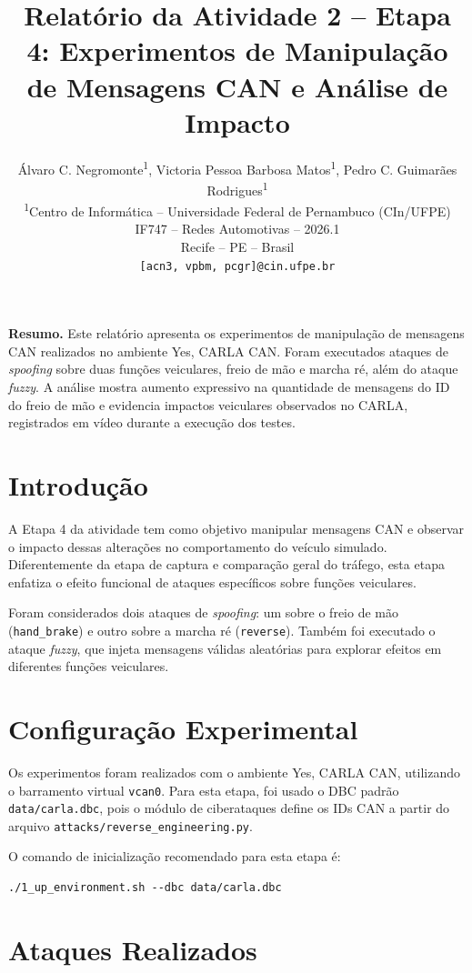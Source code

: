 \documentclass[12pt,a4paper]{article}
\title{\textbf{Relat\'orio da Atividade 2 -- Etapa 4: Experimentos de Manipula\c{c}\~ao de Mensagens CAN e An\'alise de Impacto}}
\author{
\'Alvaro C. Negromonte\textsuperscript{1},
Victoria Pessoa Barbosa Matos\textsuperscript{1},
Pedro C. Guimar\~aes Rodrigues\textsuperscript{1}
\\[0.3cm]
\textsuperscript{1}Centro de Inform\'atica -- Universidade Federal de Pernambuco (CIn/UFPE)
\\
IF747 -- Redes Automotivas -- 2026.1
\\
Recife -- PE -- Brasil
\\
\texttt{[acn3, vpbm, pcgr]@cin.ufpe.br}
}
\date{}
\begin{document}
\maketitle

\noindent\textbf{Resumo.}
Este relat\'orio apresenta os experimentos de manipula\c{c}\~ao de mensagens CAN
realizados no ambiente Yes, CARLA CAN. Foram executados ataques de \textit{spoofing}
sobre duas fun\c{c}\~oes veiculares, freio de m\~ao e marcha r\'e, al\'em do ataque
\textit{fuzzy}. A an\'alise mostra aumento expressivo na quantidade de mensagens do ID
do freio de m\~ao e evidencia impactos veiculares observados no CARLA, registrados em
v\'ideo durante a execu\c{c}\~ao dos testes.

\section{Introdu\c{c}\~ao}

A Etapa 4 da atividade tem como objetivo manipular mensagens CAN e observar o
impacto dessas altera\c{c}\~oes no comportamento do ve\'iculo simulado. Diferentemente da
etapa de captura e compara\c{c}\~ao geral do tr\'afego, esta etapa enfatiza o efeito funcional
de ataques espec\'ificos sobre fun\c{c}\~oes veiculares.

Foram considerados dois ataques de \textit{spoofing}: um sobre o freio de m\~ao
(\texttt{hand\_brake}) e outro sobre a marcha r\'e (\texttt{reverse}). Tamb\'em foi
executado o ataque \textit{fuzzy}, que injeta mensagens v\'alidas aleat\'orias para
explorar efeitos em diferentes fun\c{c}\~oes veiculares.

\section{Configura\c{c}\~ao Experimental}

Os experimentos foram realizados com o ambiente Yes, CARLA CAN, utilizando o
barramento virtual \texttt{vcan0}. Para esta etapa, foi usado o DBC padr\~ao
\texttt{data/carla.dbc}, pois o m\'odulo de ciberataques define os IDs CAN a partir do
arquivo \texttt{attacks/reverse\_engineering.py}.

O comando de inicializa\c{c}\~ao recomendado para esta etapa \'e:

\begin{verbatim}
./1_up_environment.sh --dbc data/carla.dbc
\end{verbatim}

\section{Ataques Realizados}
\end{document}
